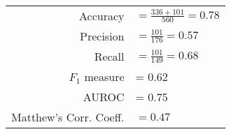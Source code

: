 \begin{tabular}{rl}
\rule{0pt}{12pt} Accuracy & $= \frac{336 + 101}{560} = 0.78$  \tabularnewline
\rule{0pt}{12pt} Precision & $= \frac{101}{176} = 0.57$ \tabularnewline
\rule{0pt}{12pt} Recall & $= \frac{101}{149} = 0.68$  \tabularnewline
\rule{0pt}{12pt} $F_1$ measure &= 0.62 \tabularnewline
\rule{0pt}{12pt} AUROC &= 0.75 \tabularnewline
\rule{0pt}{12pt} Matthew's Corr. Coeff. & $= 0.47$ \tabularnewline
\end{tabular}
